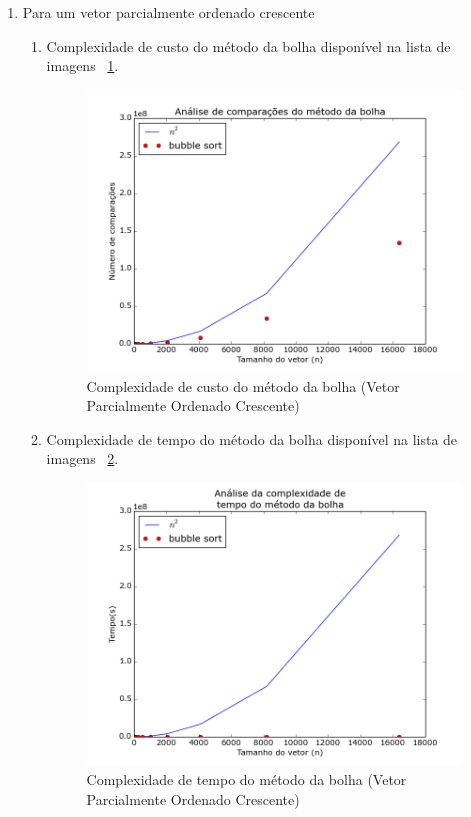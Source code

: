 \documentclass[12pt,a4paper,twoside]{report}
\begin{document}
\begin{enumerate}
\begin{enumerate}
				\end{enumerate}
				
				
			\item Para um vetor parcialmente ordenado crescente
							\begin{enumerate}
								\item Complexidade de custo do método da bolha disponível na lista de imagens ~\ref{fig:BubblePlot1POC}.
								\begin{figure}[!h]
									\centering
									\includegraphics[scale=0.6]{../imagens/Bubble/bubble_plot_1_parcialmente_ordenado_crescente.png}
									\caption{Complexidade de custo do método da bolha (Vetor Parcialmente Ordenado Crescente) \label{fig:BubblePlot1POC}}
								\end{figure}
								
								
								\item Complexidade de tempo do método da bolha disponível na lista de imagens ~\ref{fig:BubblePlot2POC}.
								\begin{figure}[!h]
									\centering
									\includegraphics[scale=0.6]{../imagens/Bubble/bubble_plot_2_parcialmente_ordenado_crescente.png}
									\caption{Complexidade de tempo do método da bolha (Vetor Parcialmente Ordenado Crescente) \label{fig:BubblePlot2POC}}
								\end{figure}
								

\end{enumerate}
\end{enumerate}
\end{document}
